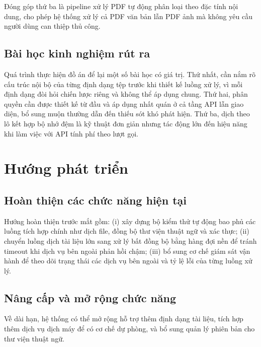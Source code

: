 \documentclass[../DoAn.tex]{subfiles}
\begin{document}
Đóng góp thứ ba là pipeline xử lý PDF tự động phân loại theo đặc tính nội dung, cho phép hệ thống xử lý cả PDF văn bản lẫn PDF ảnh mà không yêu cầu người dùng can thiệp thủ công.

\subsection{Bài học kinh nghiệm rút ra}

Quá trình thực hiện đồ án để lại một số bài học có giá trị. Thứ nhất, cần nắm rõ cấu trúc nội bộ của từng định dạng tệp trước khi thiết kế luồng xử lý, vì mỗi định dạng đòi hỏi chiến lược riêng và không thể áp dụng chung. Thứ hai, phân quyền cần được thiết kế từ đầu và áp dụng nhất quán ở cả tầng API lẫn giao diện, bổ sung muộn thường dẫn đến thiếu sót khó phát hiện. Thứ ba, dịch theo lô kết hợp bộ nhớ đệm là kỹ thuật đơn giản nhưng tác động lớn đến hiệu năng khi làm việc với API tính phí theo lượt gọi.

\section{Hướng phát triển}

\subsection{Hoàn thiện các chức năng hiện tại}

Hướng hoàn thiện trước mắt gồm: (i) xây dựng bộ kiểm thử tự động bao phủ các luồng tích hợp chính như dịch file, đồng bộ thư viện thuật ngữ và xác thực; (ii) chuyển luồng dịch tài liệu lớn sang xử lý bất đồng bộ bằng hàng đợi nền để tránh timeout khi dịch vụ bên ngoài phản hồi chậm; (iii) bổ sung cơ chế giám sát vận hành để theo dõi trạng thái các dịch vụ bên ngoài và tỷ lệ lỗi của từng luồng xử lý.

\subsection{Nâng cấp và mở rộng chức năng}

Về dài hạn, hệ thống có thể mở rộng hỗ trợ thêm định dạng tài liệu, tích hợp thêm dịch vụ dịch máy để có cơ chế dự phòng, và bổ sung quản lý phiên bản cho thư viện thuật ngữ.
\end{document}
